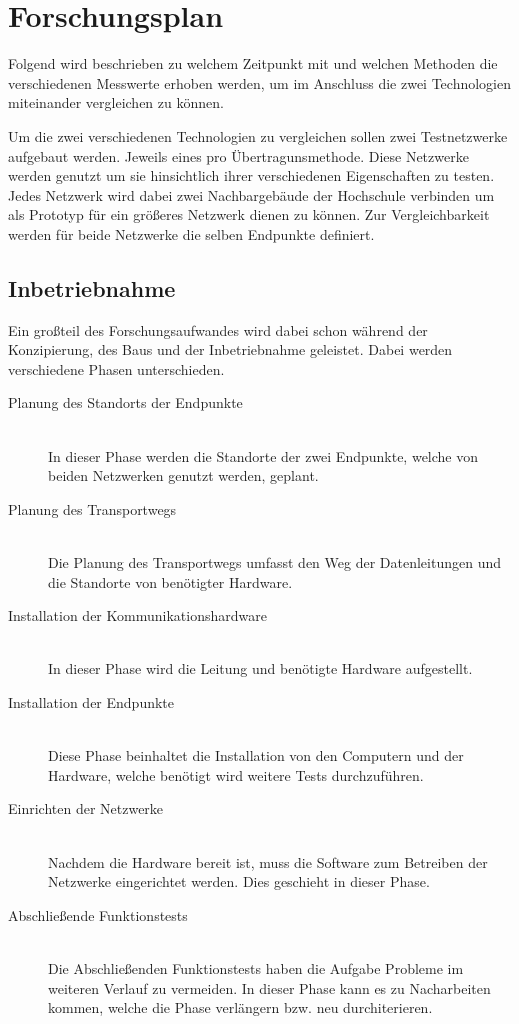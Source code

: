\chapter{Forschungsplan}

Folgend wird beschrieben zu welchem Zeitpunkt mit und welchen Methoden die verschiedenen Messwerte erhoben werden, um im Anschluss die zwei Technologien miteinander vergleichen zu können.

Um die zwei verschiedenen Technologien zu vergleichen sollen zwei Testnetzwerke aufgebaut werden.
Jeweils eines pro Übertragunsmethode.
Diese Netzwerke werden genutzt um sie hinsichtlich ihrer verschiedenen Eigenschaften zu testen.
Jedes Netzwerk wird dabei zwei Nachbargebäude der Hochschule verbinden um als Prototyp für ein größeres Netzwerk dienen zu können.
Zur Vergleichbarkeit werden für beide Netzwerke die selben Endpunkte definiert.

\section{Inbetriebnahme}\label{inbetriebnahme}

Ein großteil des Forschungsaufwandes wird dabei schon während der Konzipierung, des Baus und der Inbetriebnahme geleistet.
Dabei werden verschiedene Phasen unterschieden.

\begin{description}
    \item [Planung des Standorts der Endpunkte]\hfill \\
        In dieser Phase werden die Standorte der zwei Endpunkte, welche von beiden Netzwerken genutzt werden, geplant.
    \item [Planung des Transportwegs]\hfill \\
        Die Planung des Transportwegs umfasst den Weg der Datenleitungen und die Standorte von benötigter Hardware.
    \item [Installation der Kommunikationshardware]\hfill \\
        In dieser Phase wird die Leitung und benötigte Hardware aufgestellt.
    \item [Installation der Endpunkte]\hfill \\
        Diese Phase beinhaltet die Installation von den Computern und der Hardware, welche benötigt wird weitere Tests durchzuführen.
    \item [Einrichten der Netzwerke] \hfill \\
        Nachdem die Hardware bereit ist, muss die Software zum Betreiben der Netzwerke eingerichtet werden. Dies geschieht in dieser Phase.
    \item [Abschließende Funktionstests] \hfill \\
        Die Abschließenden Funktionstests haben die Aufgabe Probleme im weiteren Verlauf zu vermeiden.
        In dieser Phase kann es zu Nacharbeiten kommen, welche die Phase verlängern bzw. neu durchiterieren.
\end{description}

